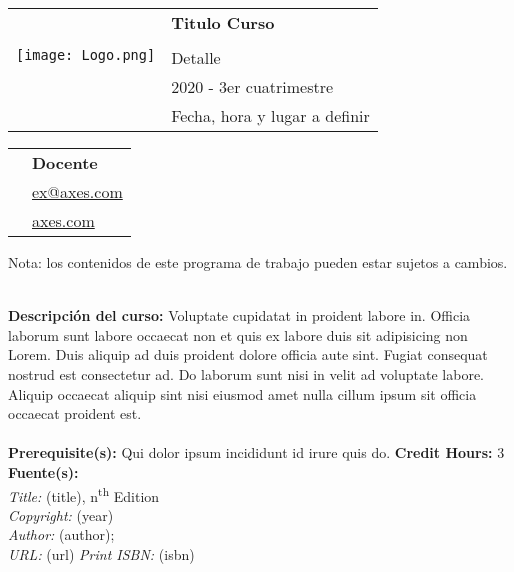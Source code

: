 \documentclass[11pt]{article}
\begin{document}
\begin{tabular}{ l l }
  \multirow{4}{*}{\texttt{[image: Logo.png]}} & \textcolor{AzulFlacso} {\textbf{\LARGE Titulo Curso}} \\\\ & \LARGE Detalle\\
  & \large 2020 - 3er cuatrimestre\\
 & \normalsize Fecha, hora y lugar a definir \\
\end{tabular}
\vspace{10mm}

\begin{tabular}{ l l }
  & \large \textbf{Docente} \\
  & \large \href{mailto:ex@axes.com}{ex@axes.com} \\
  & \href{https://www.axes.com}{axes.com}  \\ %
\end{tabular}
\vspace{5mm}
\begin{center} Nota: los contenidos de este programa de trabajo pueden estar sujetos a cambios. \\
\end{center}

\textbf {\large \\ Descripción del curso:} Voluptate cupidatat in proident labore in. Officia laborum sunt labore occaecat non et quis ex labore duis sit adipisicing non Lorem. Duis aliquip ad duis proident dolore officia aute sint. Fugiat consequat nostrud est consectetur ad. Do laborum sunt nisi in velit ad voluptate labore. Aliquip occaecat aliquip sint nisi eiusmod amet nulla cillum ipsum sit officia occaecat proident est.  \\\\
\textbf {Prerequisite(s):} Qui dolor ipsum incididunt id irure quis do.
\textbf {Credit Hours:} 3 \\

\textbf {\large Fuente(s):} \\

\emph{Title:} (title), n\textsuperscript{th} Edition \\
\emph {Copyright:} (year) \\
\emph {Author:} (author);\\
\emph {URL:} (url)
\emph {Print ISBN:} (isbn)\\
\end{document}
